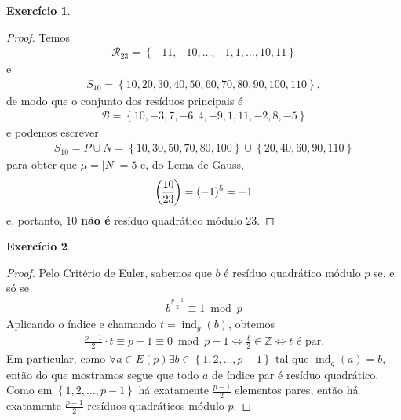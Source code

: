 \documentclass[a4paper,12pt]{article}
\DeclareMathOperator{\ind}{ind}
\theoremstyle{definition}
\newtheorem{exercise}{Exercício}%
\newcommand{\genlegendre}[4]{%
	\genfrac{(}{)}{}{#1}{#3}{#4}%
	\if\relax\detokenize{#2}\relax\else_{\!#2}\fi
}
\newcommand{\legendre}[3][]{\genlegendre{}{#1}{#2}{#3}}
\begin{document}
	\begin{exercise}
		\begin{proof}
			Temos
			\begin{align*}
			\mathcal{R}_{23} = \left\{ -11,-10,\dots,-1,1,\dots,10,11 \right\}
			\end{align*}
			e
			\begin{align*}
			S_{10} = \left\{ 10,20,30,40,50,60,70,80,90,100,110 \right\},
			\end{align*}
			de modo que o conjunto dos resíduos principais é
			\begin{align*}
			\mathcal{B} = \left\{ 10,-3,7,-6,4,-9,1,11,-2,8,-5 \right\}
			\end{align*}
			e podemos escrever
			\begin{align*}
			S_{10} = P\cup N = \left\{ 10,30,50,70,80,100 \right\}\cup\left\{20,40,60,90,110\right\}
			\end{align*}
			para obter que $\mu = |N| = 5$ e, do Lema de Gauss,
			\begin{align*}
			\legendre[]{10}{23} = (-1)^5 = -1
			\end{align*}
			e, portanto, $10$ \textbf{não é} resíduo quadrático módulo $23$.
		\end{proof}
	\end{exercise}

	\begin{exercise}
		\begin{proof}
			Pelo Critério de Euler, sabemos que $b$ é resíduo quadrático módulo $p$ se, e só se
			\begin{align*}
			b^{\frac{p-1}{2}}\equiv 1\bmod p
			\end{align*}
			Aplicando o índice e chamando $t = \ind_g(b)$, obtemos
			\begin{align*}
			\frac{p-1}{2}\cdot t\equiv p-1\equiv 0\bmod p-1 \Longleftrightarrow \frac{t}{2}\in\mathbb{Z}\Longleftrightarrow t \text{ é par.}
			\end{align*}
			Em particular, como $\forall a\in E(p)\exists b\in\left\{1,2,\dots,p-1\right\}$ tal que $\ind_g(a) = b$, então do que mostramos segue que todo $a$ de índice par é resíduo quadrático. Como em $\left\{ 1,2,\dots,p-1 \right\}$ há exatamente $\displaystyle{\frac{p-1}{2}}$ elementos pares, então há exatamente $\displaystyle{\frac{p-1}{2}}$ resíduos quadráticos módulo $p$.
		\end{proof}
	\end{exercise}
\end{document}
